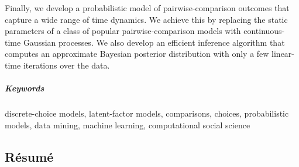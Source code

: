 Finally, we develop a probabilistic model of pairwise-comparison outcomes that capture a wide range of time dynamics.
We achieve this by replacing the static parameters of a class of popular pairwise-comparison models with continuous-time Gaussian processes.
We also develop an efficient inference algorithm that computes an approximate Bayesian posterior distribution with only a few linear-time iterations over the data.


\paragraph{Keywords}
discrete-choice models, latent-factor models, comparisons, choices, probabilistic models, data mining, machine learning, computational social science

\cleardoublepage

\begin{otherlanguage}{french}
	\chapter*{Résumé}

\end{otherlanguage}
